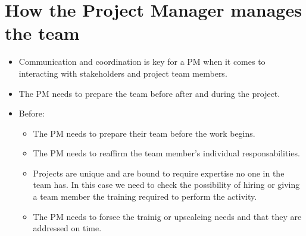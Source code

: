 \section{How the Project Manager manages the team}
\begin{itemize}
    \item Communication and coordination is key for a PM when it comes to interacting with stakeholders and project team members.
    \item The PM needs to prepare the team before after and during the project.
    \item Before:
        \begin{itemize}
            \item The PM needs to prepare their team before the work begins.
            \item The PM needs to reaffirm the team member's individual responsabilities.
            \item Projects are unique and are bound to require expertise no one in the team has. In this case we need to check the possibility of hiring or giving a team member the training required to perform the activity.
            \item The PM needs to forsee the trainig or upscaleing needs and that they are addressed on time.
        \end{itemize}
    

\end{itemize}
